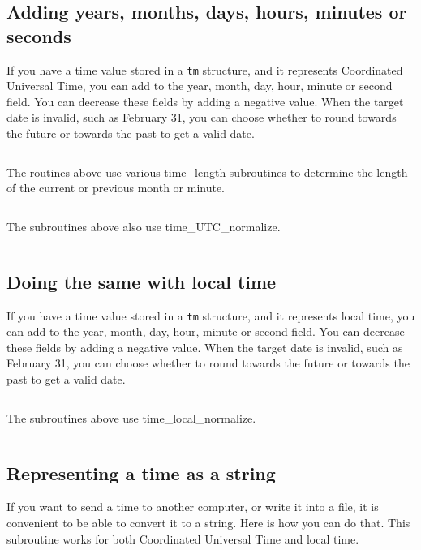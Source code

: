 \documentclass[letterpaper,twoside]{article}
\begin{document}
\subsection{Adding years, months, days, hours, minutes or seconds}
\label{subsection:timeUTCadd}
If you have a time value stored in a \verb|tm| structure, and it represents
Coordinated Universal Time, you can add to the year, month, day, hour,
minute or second field.  You can decrease these fields by adding a
negative value.  When the target date is invalid, such as February 31,
you can choose whether to round towards the future or towards the past
to get a valid date.
\inputminted[firstline=32]{c}{time_utc_add.c}
The routines above use various time\_length subroutines to determine
the length of the current or previous month or minute.
\inputminted[firstline=32]{c}{time_length.c}

The subroutines above also use time\_UTC\_normalize.
\inputminted[firstline=32]{c}{time_utc_normalize.c}

\subsection{Doing the same with local time}
\label{subsection:timelocaladd}
If you have a time value stored in a \verb|tm| structure, and it represents
local time, you can add to the year, month, day, hour, minute or
second field.  You can decrease these fields by adding a negative
value.  When the target date is invalid, such as February 31,
you can choose whether to round towards the future or towards the past
to get a valid date.
\inputminted[firstline=32]{c}{time_local_add.c}
The subroutines above use time\_local\_normalize.
\inputminted[firstline=32]{c}{time_local_normalize.c}

\subsection{Representing a time as a string}
\label{subsection:tostring}
If you want to send a time to another computer, or write it into a file,
it is convenient to be able to convert it to a string.  Here is how you
can do that.  This subroutine works for both Coordinated Universal Time
and local time.
\inputminted[firstline=34]{c}{time_tm_to_string.c}
\end{document}
